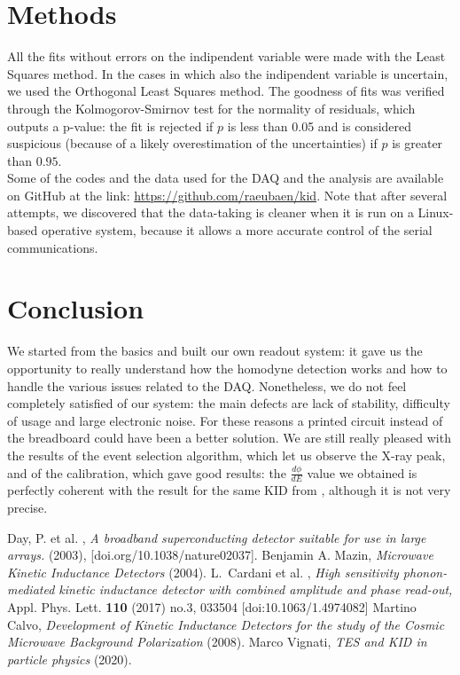 \documentclass[12pt]{article}
\begin{document}
\section{Methods}
All the fits without errors on the indipendent variable were made with the Least Squares method. In the cases in which also the indipendent variable is uncertain, we used the Orthogonal Least Squares method. The goodness of fits was verified through the Kolmogorov-Smirnov test for the normality of residuals, which outputs a p-value: the fit is rejected if $p$ is less than 0.05 and is considered suspicious (because of a likely overestimation of the uncertainties) if $p$ is greater than $0.95$.\\
Some of the codes and the data used for the DAQ and the analysis are available on GitHub at the link: \url{https://github.com/raeubaen/kid}.
Note that after several attempts, we discovered that the data-taking is cleaner when it is run on a Linux-based operative system, because it allows a more accurate control of the serial communications.
\section{Conclusion}
We started from the basics and built our own readout system: it gave us the opportunity to really understand how the homodyne detection works and how to handle the various issues related to the DAQ. Nonetheless, we do not feel completely satisfied of our system: the main defects are lack of stability, difficulty of usage and large electronic noise. For these reasons a printed circuit instead of the breadboard could have been a better solution. We are still really pleased with the results of the event selection algorithm, which let us observe the X-ray peak, and of the calibration, which gave good results: the $\frac{d \phi}{dE}$ value we obtained is perfectly coherent with the result for the same KID from \cite{Cardani}, although it is not very precise.
\begin{thebibliography}{99}
\bibitem{}
Day, P. et al. ,
\textit{A broadband superconducting detector suitable for use in large arrays.} (2003), [doi.org/10.1038/nature02037].
\bibitem{}
Benjamin A. Mazin,
\textit{Microwave Kinetic Inductance Detectors} (2004).
L.~Cardani et al. , \textit{High sensitivity phonon-mediated kinetic inductance detector with combined amplitude and phase read-out,}
Appl. Phys. Lett. \textbf{110} (2017) no.3, 033504
[doi:10.1063/1.4974082]
\bibitem{}
Martino Calvo,
\textit{Development of Kinetic Inductance Detectors for the study of the Cosmic Microwave Background Polarization} (2008).
\bibitem{}
Marco Vignati, 
\textit{TES and KID in particle physics}
(2020).
\end{thebibliography}
\end{document}
